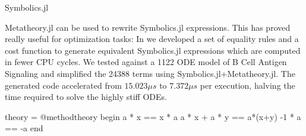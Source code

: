 \documentclass[8pt]{beamer}  %
\begin{document}









\begin{frame}[fragile]{Symbolics.jl}

Metatheory.jl can be used to rewrite Symbolics.jl expressions. This has proved really useful for optimization tasks:
In  we developed a set of equality rules and a cost function to generate equivalent Symbolics.jl expressions which are computed in fewer CPU cycles. We tested against a 1122 ODE model of B Cell Antigen Signaling and simplified the 24388 terms using Symbolics.jl+Metatheory.jl. The generated code accelerated from $15.023\mu s$ to $7.372\mu s$ per execution, halving the time required to solve the highly stiff ODEs.

\begin{jllisting}
theory = @methodtheory begin
    a * x == x * a
    a * x + a * y == a*(x+y)
    -1 * a == -a
end
\end{jllisting}

\end{frame}
\end{document}
